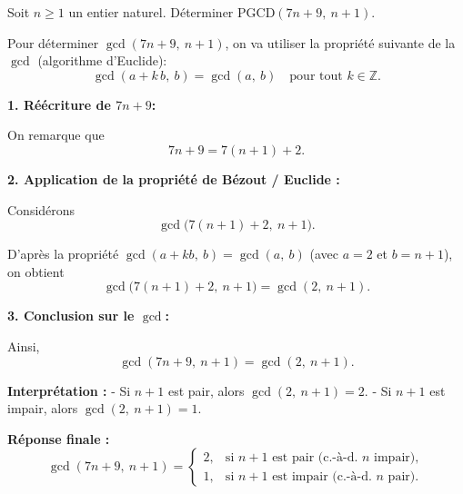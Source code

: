 \documentclass[a4paper,12pt]{article}
\begin{document}
\begin{exercice}[title=Exercice 10 $\quad \star \star \quad$ {[Calculer, Raisonner, Chercher]}]
Soit $n\ge1$ un entier naturel. Déterminer $\mathrm{PGCD}(7n +9,\ n+1).$
\end{exercice}
\begin{solutionbox}
    
Pour déterminer $\gcd(7n+9,\ n+1)$, on va utiliser la propriété suivante de la $\gcd$ (algorithme d'Euclide):  
\[
\gcd(a + k\,b,\ b) = \gcd(a,\ b)\quad\text{pour tout }k\in\mathbb{Z}.
\]

\medskip

\textbf{1. Réécriture de $7n + 9$:}

On remarque que
$$
7n + 9 = 7(n+1) + 2.
$$

\textbf{2. Application de la propriété de Bézout / Euclide :}

Considérons
$$
\gcd\bigl(7(n+1) + 2,\ n+1\bigr).
$$

D’après la propriété $\gcd(a + kb,\ b) = \gcd(a,\ b)$ (avec $a = 2$ et $b = n+1$), on obtient
$$
\gcd\bigl(7(n+1)+2,\ n+1\bigr) = \gcd(2,\ n+1).
$$

\textbf{3. Conclusion sur le $\gcd$:}

Ainsi,
$$
\gcd(7n+9,\ n+1) = \gcd(2,\ n+1).
$$

\medskip

\textbf{Interprétation :}
- Si $n+1$ est pair, alors $\gcd(2,\ n+1) = 2.$
- Si $n+1$ est impair, alors $\gcd(2,\ n+1) = 1.$

\medskip

\textbf{Réponse finale :}
$$
\gcd(7n + 9,\ n+1) =
\begin{cases}
2, & \text{si $n+1$ est pair (c.-à-d. $n$ impair)},\\
1, & \text{si $n+1$ est impair (c.-à-d. $n$ pair)}.
\end{cases}
$$
\end{solutionbox}

% 
% 
% 
% 
% 
% 
\end{document}
